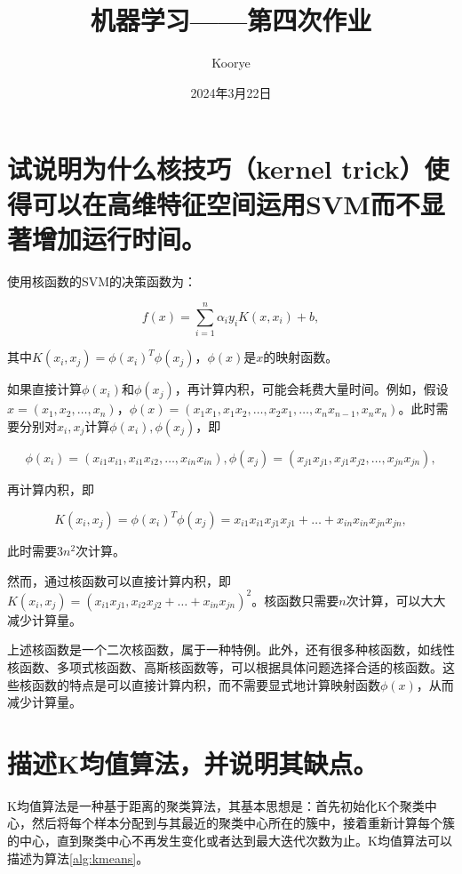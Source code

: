 \documentclass{article}
\title{机器学习——第四次作业}
\author{Koorye}
\date{2024年3月22日}
\begin{document}
\maketitle
\thispagestyle{fancy}

\section{试说明为什么核技巧（kernel trick）使得可以在高维特征空间运用SVM而不显著增加运行时间。}

使用核函数的SVM的决策函数为：

\begin{equation}
    f(x) = \sum_{i=1}^{n} \alpha_i y_i K(x, x_i) + b,
\end{equation}

其中$K(x_i, x_j)=\phi(x_i)^T \phi(x_j)$，$\phi(x)$是$x$的映射函数。

如果直接计算$\phi(x_i)$和$\phi(x_j)$，再计算内积，可能会耗费大量时间。例如，假设$x=(x_1,x_2,\dots,x_n)$，$\phi(x)=(x_1x_1,x_1x_2,\dots,x_2x_1,\dots,x_nx_{n-1},x_nx_n)$。此时需要分别对$x_i,x_j$计算$\phi(x_i),\phi(x_j)$，即

\begin{equation}
    \phi(x_i) = (x_{i1}x_{i1},x_{i1}x_{i2},\dots,x_{in}x_{in}),
    \phi(x_j) = (x_{j1}x_{j1},x_{j1}x_{j2},\dots,x_{jn}x_{jn}),
\end{equation}

再计算内积，即

\begin{equation}
    K(x_i,x_j) = \phi(x_i)^T \phi(x_j) = x_{i1}x_{i1}x_{j1}x_{j1}+\dots+x_{in}x_{in}x_{jn}x_{jn},
\end{equation}

此时需要$3n^2$次计算。

然而，通过核函数可以直接计算内积，即$K(x_i,x_j)=(x_{i1}x_{j1},x_{i2}x_{j2}+\dots+x_{in}x_{jn})^2$。核函数只需要$n$次计算，可以大大减少计算量。

上述核函数是一个二次核函数，属于一种特例。此外，还有很多种核函数，如线性核函数、多项式核函数、高斯核函数等，可以根据具体问题选择合适的核函数。这些核函数的特点是可以直接计算内积，而不需要显式地计算映射函数$\phi(x)$，从而减少计算量。

\section{描述K均值算法，并说明其缺点。}

K均值算法是一种基于距离的聚类算法，其基本思想是：首先初始化K个聚类中心，然后将每个样本分配到与其最近的聚类中心所在的簇中，接着重新计算每个簇的中心，直到聚类中心不再发生变化或者达到最大迭代次数为止。K均值算法可以描述为算法\ref{alg:kmeans}。
\end{document}
